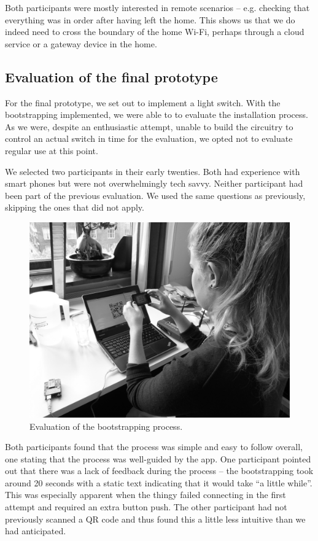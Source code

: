 \documentclass{ubicomp2012}
\begin{document}
Both participants were mostly interested in remote scenarios -- e.g. checking that everything was in order after having left the home. This shows us that we do indeed need to cross the boundary of the home Wi-Fi, perhaps through a cloud service or a gateway device in the home.

\subsection{Evaluation of the final prototype}

For the final prototype, we set out to implement a light switch. With the bootstrapping implemented, we were able to to evaluate the installation process. As we were, despite an enthusiastic attempt, unable to build the circuitry to control an actual switch in time for the evaluation, we opted not to evaluate regular use at this point.

We selected two participants in their early twenties. Both had experience with smart phones but were not overwhelmingly tech savvy. Neither participant had been part of the previous evaluation. We used the same questions as previously, skipping the ones that did not apply.

\begin{figure}[th]
\begin{center}
\includegraphics[width=0.90\columnwidth]{figures/evaluation-picture.jpg}
\end{center}
\caption{Evaluation of the bootstrapping process.}
\label{fig:evalPic}
\end{figure}

Both participants found that the process was simple and easy to follow overall, one stating that the process was well-guided by the app. One participant pointed out that there was a lack of feedback during the process -- the bootstrapping took around 20 seconds with a static text indicating that it would take ``a little while''. This was especially apparent when the thingy failed connecting in the first attempt and required an extra button push. The other participant had not previously scanned a QR code and thus found this a little less intuitive than we had anticipated.
\end{document}
